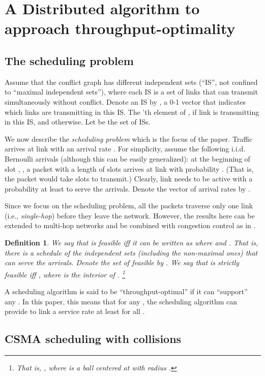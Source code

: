 \documentclass{IEEEtran}
\newtheorem{definitn}{Definition}
\begin{document}
\section{\label{sec:algorithms}A Distributed algorithm to approach throughput-optimality}


\subsection{The scheduling problem}

Assume that the conflict graph  has  different independent
sets ({}``IS'', not confined to {}``maximal independent sets''),
where each IS is a set of links that can transmit simultaneously without
conflict. Denote an IS by , a 0-1 vector that
indicates which links are transmitting in this IS. The 'th element
of ,  if link  is transmitting in this
IS, and  otherwise. Let  be the set of ISs. 

We now describe the \emph{scheduling problem} which is the focus of
the paper. Traffic arrives at link  with an arrival rate .
For simplicity, assume the following i.i.d. Bernoulli arrivals (although
this can be easily generalized): at the beginning of slot ,
, a packet with a length of  slots arrives at
link  with probability . (That is, the packet would
take  slots to transmit.) Clearly, link  needs to be active
with a probability at least  to serve the arrivals.
Denote the vector of arrival rates by . 

Since we focus on the scheduling problem, all the packets traverse
only one link (i.e., \emph{single-hop}) before they leave the network.
However, the results here can be extended to multi-hop networks and
be combined with congestion control as in \cite{Allerton}.
\begin{definitn}
\label{def:feasible}We say that  is\emph{ feasible}
iff it can be written as 
where  and .
That is, there is a schedule of the independent sets (including the
non-maximal ones) that can serve the arrivals. Denote the set of feasible
 by . We say that 
is \emph{strictly feasible} iff , where 
is the interior of . \footnote{That is, ,
where 
is a ball centered at  with radius .}
\end{definitn}
A scheduling algorithm is said to be {}``throughput-optimal'' if
it can {}``support'' any . In this paper, this
means that for any , the scheduling algorithm
can provide to link  a service rate at least  for
all .


\subsection{CSMA scheduling with collisions}
\end{document}
